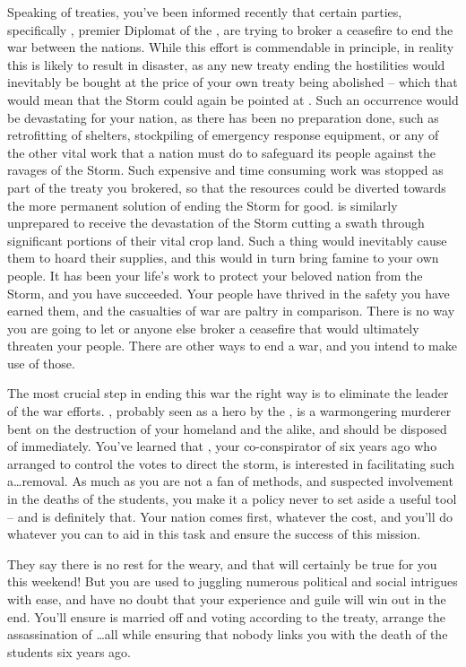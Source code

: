 \documentclass[char]{GL2020}
\begin{document}
Speaking of treaties, you’ve been informed recently that certain parties, specifically \cHeadDiplomat{}, premier Diplomat of the \pShip{}, are trying to broker a ceasefire to end the war between the nations. While this effort is commendable in principle, in reality this is likely to result in disaster, as any new treaty ending the hostilities would inevitably be bought at the price of your own treaty being abolished -- which that would mean that the Storm could again be pointed at \pTech{}. Such an occurrence would be devastating for your nation, as there has been no preparation done, such as retrofitting of shelters, stockpiling of emergency response equipment, or any of the other vital work that a nation must do to safeguard its people against the ravages of the Storm. Such expensive and time consuming work was stopped as part of the treaty you brokered, so that the resources could be diverted towards the more permanent solution of ending the Storm for good. \pFarm{} is similarly unprepared to receive the devastation of the Storm cutting a swath through significant portions of their vital crop land. Such a thing would inevitably cause them to hoard their supplies, and this would in turn bring famine to your own people. It has been your life’s work to protect your beloved nation from the Storm, and you have succeeded. Your people have thrived in the safety you have earned them, and the casualties of war are paltry in comparison. There is no way you are going to let \cHeadDiplomat{} or anyone else broker a ceasefire that would ultimately threaten your people.  There are other ways to end a war, and you intend to make use of those.

The most crucial step in ending this war the right way is to eliminate the leader of the \pShip{} war efforts. \cLoud{}, probably seen as a hero by the \pShippies{}, is a warmongering murderer bent on the destruction of your homeland and the \pFarm{} alike, and should be disposed of immediately. You’ve learned that \cEvil{}, your co-conspirator of six years ago who arranged to control the votes to direct the storm, is interested in facilitating such a\ldots removal.  As much as you are not a fan of \cEvil{\their} methods, and \cEvil{\their} suspected involvement in the deaths of the students, you make it a policy never to set aside a useful tool -- and \cEvil{} is definitely that. Your nation comes first, whatever the cost, and you’ll do whatever you can to aid \cEvil{} in this task and ensure the success of this mission.

They say there is no rest for the weary, and that will certainly be true for you this weekend!  But you are used to juggling numerous political and social intrigues with ease, and have no doubt that your experience and guile will win out in the end.  You’ll ensure \cHeir{} is married off and voting according to the treaty, arrange the assassination of \cLoud{}\ldots all while ensuring that nobody links you with the death of the students six years ago.
\end{document}
